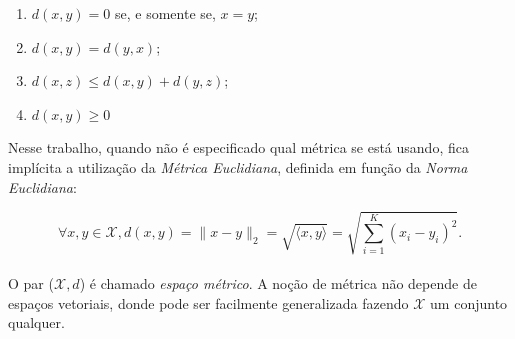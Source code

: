 \documentclass[a4paper,12pt]{article}
\begin{document}
\begin{enumerate}
	\item $d(x,y) = 0$ se, e somente se, $x = y$; 
	\item $d(x,y) = d(y,x)$;
	\item $d(x,z) \leq d(x,y) + d(y,z)$;
	\item $d(x,y) \geq 0$
\end{enumerate}

Nesse trabalho, quando não é especificado qual métrica se está usando, fica implícita a utilização da \textit{Métrica Euclidiana}, definida em função da \textit{Norma Euclidiana}:

\begin{equation}\tag{Norma Euclidiana}
\forall x, y \in \mathcal{X}, d(x,y) = \lVert x-y \rVert_2 = \sqrt{\langle x, y\rangle} = \sqrt{\sum_{i = 1}^{K} (x_i-y_i)^2}.
\label{eq:normaEuclidiana}
\end{equation}
\\

O par ($\mathcal{X}, d$) é chamado \textit{espaço métrico}. A noção de métrica não depende de espaços vetoriais, donde pode ser facilmente generalizada fazendo $\mathcal{X}$ um conjunto qualquer.
\end{document}
